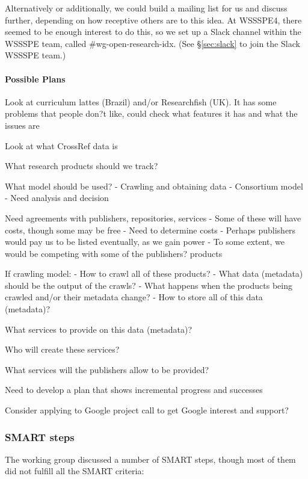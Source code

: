 Alternatively or additionally, we could build a mailing list for us and discuss further, depending on how receptive others are to this idea.  At WSSSPE4, there seemed to be enough interest to do this, so we set up a Slack channel within the WSSSPE team, called \#wg-open-research-idx.  (See \S\ref{sec:slack} to join the Slack WSSSPE team.)


\paragraph{Possible Plans}

Look at curriculum lattes (Brazil) and/or Researchfish (UK).  It has some problems that people don?t like, could check what features it has and what the issues are

Look at what CrossRef data is

What research products should we track?

What model should be used?
- Crawling and obtaining data
- Consortium model
- Need analysis and decision

Need agreements with publishers, repositories, services
- Some of these will have costs, though some may be free
- Need to determine costs
- Perhaps publishers would pay us to be listed eventually, as we gain power
- To some extent, we would be competing with some of the publishers? products

If crawling model:
- How to crawl all of these products?
- What data (metadata) should be the output of the crawls?
    - What happens when the products being crawled and/or their metadata change?
- How to store all of this data (metadata)?

What services to provide on this data (metadata)?

Who will create these services?

What services will the publishers allow to be provided?

Need to develop a plan that shows incremental progress and successes

Consider applying to Google project call to get Google interest and support?


\subsubsection{SMART steps}

The working group discussed a number of SMART steps, though most of them did not fulfill all the SMART criteria:

